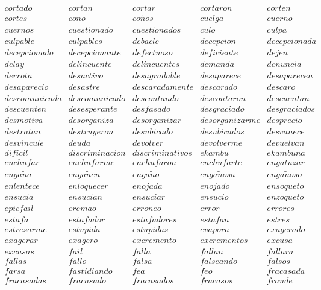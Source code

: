\noindent
$
\begin{array}{ccccc}
cortado & cortan & cortar & cortaron & corten \\
cortes & co\tilde{n}o & co\tilde{n}os & cuelga & cuerno \\
cuernos & cuestionado & cuestionados & culo & culpa \\
culpable & culpables & debacle & decepcion & decepcionada \\
decepcionado & decepcionante & defectuoso & deficiente & dejen \\
delay & delincuente & delincuentes & demanda & denuncia \\
derrota & desactivo & desagradable & desaparece & desaparecen \\
desaparecio & desastre & descaradamente & descarado & descaro \\
descomunicada & descomunicado & descontando & descontaron & descuentan \\
descuenten & desesperante & desfasado & desgraciado & desgraciados \\
desmotiva & desorganiza & desorganizar & desorganizarme & desprecio \\
destratan & destruyeron & desubicado & desubicados & desvanece \\
desvincule & deuda & devolver & devolverme & devuelvan \\
dificil & discriminacion & discriminativos & ekambu & ekambuna \\
enchufar & enchufarme & enchufaron & enchufarte & engatuzar \\
enga\tilde{n}a & enga\tilde{n}en & enga\tilde{n}o & enga\tilde{n}osa & enga\tilde{n}oso \\
enlentece & enloquecer & enojada & enojado & ensoqueto \\
ensucia & ensucian & ensuciar & ensucio & enzoqueto \\
epicfail & eremao & erroneo & error & errores \\
estafa & estafador & estafadores & estafan & estres \\
estresarme & estupida & estupidas & evapora & exagerado \\
exagerar & exagero & excremento & excrementos & excusa \\
excusas & fail & falla & fallan & fallara \\
fallas & fallo & falsa & falseando & falsos \\
farsa & fastidiando & fea & feo & fracasada \\
fracasadas & fracasado & fracasados & fracasos & fraude \\
\end{array}
$

